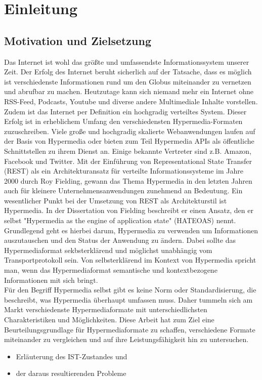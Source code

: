 \newpage
\section{Einleitung}
\subsection{Motivation und Zielsetzung}

Das Internet ist wohl das größte und umfassendste Informationssystem unserer Zeit. Der Erfolg des Internet beruht sicherlich auf der Tatsache, dass es möglich ist verschiedenste Informationen rund um den Globus miteinander zu vernetzen und abrufbar zu machen. Heutzutage kann sich niemand mehr ein Internet ohne RSS-Feed, Podcasts, Youtube und diverse andere Multimediale Inhalte vorstellen. Zudem ist das Internet per Definition ein hochgradig verteiltes System. Dieser Erfolg ist in erheblichem Umfang den verschiedensten Hypermedia-Formaten zuzuschreiben. Viele große und hochgradig skalierte Webanwendungen laufen auf der Basis von Hypermedia oder bieten zum Teil Hypermedia APIs als öffentliche Schnittstellen zu ihrem Dienst an. Einige bekannte Vertreter sind z.B. Amazon, Facebook und Twitter. Mit der Einführung von Representational State Transfer (REST) als ein Architekturansatz für verteilte Informationssysteme  im Jahre 2000 durch Roy Fielding, gewann das Thema Hypermedia in den letzten Jahren auch für kleinere Unternehmensanwendungen zunehmend an Bedeutung. Ein wesentlicher Punkt bei der Umsetzung von REST als Architekturstil ist Hypermedia. In der Dissertation von Fielding beschreibt er einen Ansatz, den er selbst "Hypermedia as the engine of application state" (HATEOAS) nennt. Grundlegend geht es hierbei darum, Hypermedia zu verwenden um Informationen auszutauschen und den Status der Anwendung zu ändern. Dabei sollte das Hypermediaformat sekbsterklärend und möglichst unabhängig vom Transportprotokoll sein. Von selbsterklärend im Kontext von Hypermedia spricht man, wenn das Hypermediaformat semantische und kontextbezogene Informationen mit sich bringt. \\
Für den Begriff Hypermedia selbst gibt es keine Norm oder Standardisierung, die beschreibt, was Hypermedia überhaupt umfassen muss. Daher tummeln sich am Markt verschiedenste Hypermediaformate mit unterschiedlichsten Charakteristiken und Möglichkeiten. Diese Arbeit hat zum Ziel eine Beurteilungsgrundlage für Hypermediaformate zu schaffen, verschiedene Formate miteinander zu vergleichen und auf ihre Leistungsfähigkeit hin zu untersuchen.


	\begin{itemize}
		\item Erläuterung des IST-Zustandes und
		\item der daraus resultierenden Probleme	
	\end{itemize}
